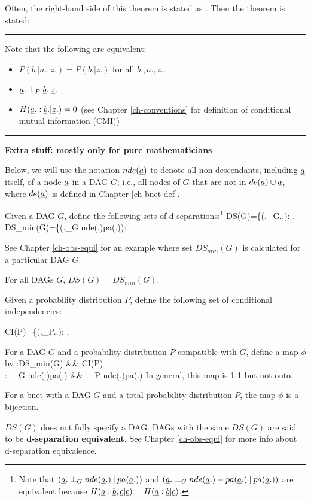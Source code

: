 Often, the right-hand side
of this theorem is stated as 
.
Then the theorem is stated:

\hrule
Note that 
the following are equivalent:
\begin{itemize}
\item
$P(b.|a., z.)=P(b.|z.)$ for all $b., a., z.$.
\item
$\rva.\perp_P \rvb.|\rvz.$
\item
$H(\rva.:\rvb.|\rvz.)=0$
(see Chapter \ref{ch-conventions}
for definition of
 conditional mutual information (CMI))
\end{itemize}
\hrule\noindent
{\bf Extra stuff: mostly only for 
 pure mathematicians}

Below, we will use
the notation $nde(\rva)$
to denote
all non-descendants,
including $\rva$ itself, 
of a node $\rva$
in a DAG $G$; i.e.,
all nodes of $G$ that are not
in $de(\rva)\cup \rva$, where
$de(\rva)$
is defined in Chapter \ref{ch-bnet-def}.

Given a DAG $G$, define 
the following
sets of d-separations:\footnote{
Note that
$(\rva.\perp_G
nde(\rva.)\cond pa(\rva.))$ and
$(\rva.\perp_G
nde(\rva.)-pa(\rva.)\cond pa(\rva.))$
are
equivalent
because
$H(\rva:\rvb, \rvc|\rvc)=
H(\rva:\rvb|\rvc)$.
}
\beq
DS(G)=\{(\rva.\perp_G\rvb.\cond\rvz.):
\;.
\eeq
\beq
DS_{min}(G)=\{(\rva.\perp_G
nde(\rva.)\cond pa(\rva.)):
\;.
\eeq

See Chapter \ref{ch-obs-equi}
for an example
where set $DS_{min}(G)$
is calculated for 
a particular DAG $G$.

\begin{claim}
For all DAGs $G$, $DS(G)=DS_{min}(G)$.
\end{claim}

Given a probability distribution  $P$, 
define the following
set of conditional independencies:

\beq
CI(P)=\{(\rva.\perp_P\rvb.\cond \rvz.):
\;,
\eeq


For a DAG $G$
and a probability
distribution $P$
compatible with $G$,
define  a map $\phi$
by
\beqa
\phi:DS_{min}(G) &\rarrow& CI(P)
\\
\phi: \rva.\perp_G nde(\rva.)\cond pa(\rva.)
&\mapsto&
\rva.\perp_P nde(\rva.)\cond pa(\rva.)
\eeqa
In general, this map
is 1-1 but not onto.


\begin{claim}
For a bnet 
with a DAG $G$
and a total probability distribution $P$,
the map $\phi$ is a bijection.
\end{claim}

$DS(G)$
does not fully specify a DAG.
DAGs with the same 
$DS(G)$ are said to be
{\bf d-separation equivalent}.
See Chapter \ref{ch-obs-equi}
for more info about 
d-separation equivalence.